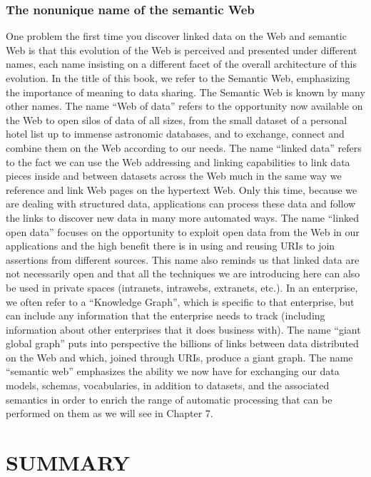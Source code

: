\subsubsection{The nonunique name of the semantic Web}

One problem the first time you discover linked data on the Web and
semantic Web is that this evolution of the Web is perceived and
presented under different names, each name insisting on a different
facet of the overall architecture of this evolution. In the title of
this book, we refer to the Semantic Web, emphasizing the importance of
meaning to data sharing. The Semantic Web is known by many other names.
The name ``Web of data'' refers to the opportunity now available on the
Web to open silos of data of all sizes, from the small dataset of a
personal hotel list up to immense astronomic databases, and to exchange,
connect and combine them on the Web according to our needs. The name
``linked data'' refers to the fact we can use the Web addressing and
linking capabilities to link data pieces inside and between datasets
across the Web much in the same way we reference and link Web pages on
the hypertext Web. Only this time, because we are dealing with structured
data, applications can process these data and follow the links to
discover new data in many more automated ways. The name ``linked open
data'' focuses on the opportunity to exploit open data from the Web in
our applications and the high benefit there is in using and reusing URIs
to join assertions from different sources. This name also reminds us
that linked data are not necessarily open and that all the techniques we
are introducing here can also be used in private spaces (intranets,
intrawebs, extranets, etc.). In an enterprise, we often refer to a
``Knowledge Graph'', which is specific to that enterprise, but can
include any information that the enterprise needs to track (including
information about other enterprises that it does business with). The
name ``giant global graph'' puts into perspective the billions of links
between data distributed on the Web and which, joined through URIs,
produce a giant graph. The name ``semantic web'' emphasizes the ability
we now have for exchanging our data models, schemas, vocabularies, in
addition to datasets, and the associated semantics in order to enrich
the range of automatic processing that can be performed on them as we
will see in Chapter 7.

\section{SUMMARY}

